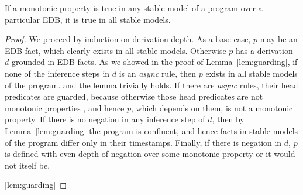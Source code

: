 \begin{lemma}
\label{lem:property}
If a monotonic property is true in any stable model of a program over a particular EDB, it is true in all stable models. 
\end{lemma}
\begin{proof}
\begin{comment}
Proof sketch: assume a monotonic property is true in one trace and false in another trace.  This means the monotonic property can differentiate between the two traces.  But since all async facts are persisted \jmh{when did we start requiring this?  I think you need to state it as an assumption in the lemma}, all messages eventually rendezvous.  Thus, the monotonic property must be able to observe the condition that some event has not yet occured (but will eventually occur). \jmh{I don't know what the preceding sentence means; I don't know what it means for a property to observe a condition.}  Monotonic properties cannot observe this though, becuase the property will be eventually untrue (when the thing that has not yet occured eventually occurs), thus it is not monotonic. \jmh{That only sorta made sense to me.}

\paa{or alternatively:}
\end{comment}
We proceed by induction on derivation depth.
As a base case, $p$ may be an EDB fact, which clearly exists in all stable models.
Otherwise $p$ has a derivation $d$ grounded in EDB facts.  As we showed in the
proof of Lemma~\ref{lem:guarding}, if none of the inference 
steps in $d$ is an {\em async} rule, then $p$ exists in all stable models
of the program.
and
the lemma trivially holds.  If there are {\em async} rules, their head predicates are guarded,
because otherwise those head predicates are not monotonic
properties 
, and hence $p$, which depends on them, is not a monotonic property.  If there 
is no negation in any inference step of $d$, then by Lemma~\ref{lem:guarding} the program
is confluent, and hence facts in stable models of the program differ only in their timestamps.
Finally, if there is negation in $d$, $p$ is defined with even depth of negation over some
monotonic property or it would not itself be.    

\ref{lem:guarding}
\end{proof}

